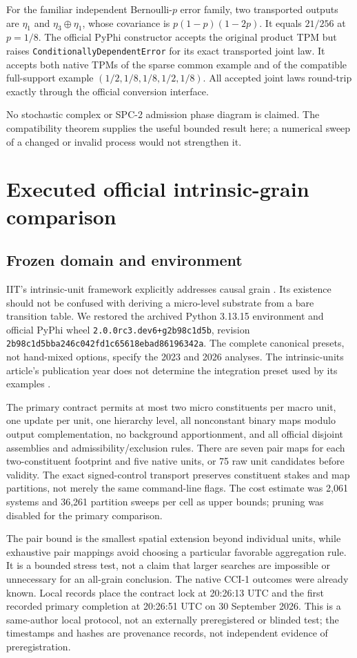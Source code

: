 \documentclass[11pt]{article}
\theoremstyle{definition}\newtheorem{definition}[theorem]{Definition}
\theoremstyle{remark}\newtheorem{remark}[theorem]{Remark}
\begin{document}
For the familiar independent Bernoulli-$p$ error family, two transported outputs are $\eta_1$ and $\eta_3\oplus\eta_1$, whose covariance is $p(1-p)(1-2p)$. It equals $21/256$ at $p=1/8$. The official PyPhi constructor accepts the original product TPM but raises \texttt{ConditionallyDependentError} for its exact transported joint law. It accepts both native TPMs of the sparse common example and of the compatible full-support example $(1/2,1/8,1/8,1/2,1/8)$. All accepted joint laws round-trip exactly through the official conversion interface.

No stochastic complex or SPC-2 admission phase diagram is claimed. The compatibility theorem supplies the useful bounded result here; a numerical sweep of a changed or invalid process would not strengthen it.

\section{Executed official intrinsic-grain comparison}
\subsection{Frozen domain and environment}
IIT's intrinsic-unit framework explicitly addresses causal grain \cite{iit2023,intrinsic}. Its existence should not be confused with deriving a micro-level substrate from a bare transition table. We restored the archived Python 3.13.15 environment and official PyPhi wheel \texttt{2.0.0rc3.dev6+g2b98c1d5b}, revision \texttt{2b98c1d5bba246c042fd1c65618ebad86196342a}. The complete canonical presets, not hand-mixed options, specify the 2023 and 2026 analyses. The intrinsic-units article's publication year does not determine the integration preset used by its examples \cite{grainhelp}.

The primary contract permits at most two micro constituents per macro unit, one update per unit, one hierarchy level, all nonconstant binary maps modulo output complementation, no background apportionment, and all official disjoint assemblies and admissibility/exclusion rules. There are seven pair maps for each two-constituent footprint and five native units, or 75 raw unit candidates before validity. The exact signed-control transport preserves constituent stakes and map partitions, not merely the same command-line flags. The cost estimate was 2,061 systems and 36,261 partition sweeps per cell as upper bounds; pruning was disabled for the primary comparison.

The pair bound is the smallest spatial extension beyond individual units, while exhaustive pair mappings avoid choosing a particular favorable aggregation rule. It is a bounded stress test, not a claim that larger searches are impossible or unnecessary for an all-grain conclusion. The native CCI-1 outcomes were already known. Local records place the contract lock at 20:26:13 UTC and the first recorded primary completion at 20:26:51 UTC on 30 September 2026. This is a same-author local protocol, not an externally preregistered or blinded test; the timestamps and hashes are provenance records, not independent evidence of preregistration.
\end{document}
